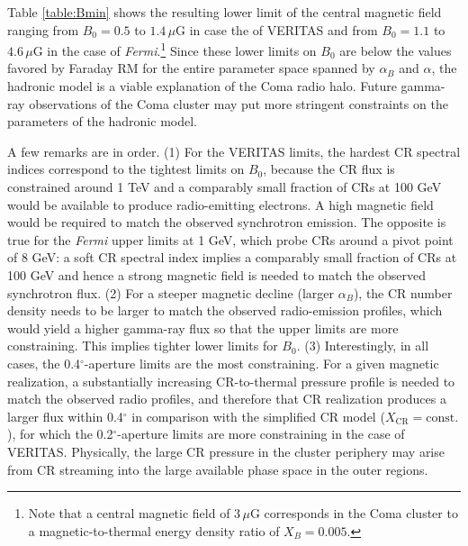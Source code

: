 \documentclass[12pt,manuscript]{aastex}
\def\Fermi{{\em Fermi}\xspace}
\newcommand{\rmn}{\mathrm}
\newcommand{\CR}{\mathrm{CR}}
\begin{document}
Table \ref{table:Bmin} shows the resulting lower limit of the central magnetic field ranging from
$B_{0} = 0.5$ to $1.4\,\mu$G in case the of VERITAS and from $B_{0} = 1.1$ to $4.6\,\mu$G in the
case of \Fermi.\footnote{Note that a central magnetic field of $3\,\mu$G corresponds in the Coma
  cluster to a magnetic-to-thermal energy density ratio of $X_B=0.005$.} Since these lower limits on
$B_{0}$ are below the values favored by Faraday RM for the entire parameter space spanned by
$\alpha_{B}$ and $\alpha$, the hadronic model is a viable explanation of the Coma radio halo. Future
gamma-ray observations of the Coma cluster may put more stringent constraints on the parameters of
the hadronic model.

A few remarks are in order. (1) For the VERITAS limits, the hardest
CR spectral indices correspond to the tightest limits on $B_{0}$, because the CR flux is constrained
around 1 TeV and a comparably small fraction of CRs at 100 GeV would be available to produce
radio-emitting electrons. A high magnetic field would be required to match the observed
synchrotron emission. The opposite is true for the \Fermi upper limits at 1 GeV, which
probe CRs around a pivot point of 8 GeV: a soft CR spectral index implies a comparably small
fraction of CRs at 100 GeV and hence a strong magnetic field is needed to match the observed
synchrotron flux. (2) For a steeper
magnetic decline (larger $\alpha_{B}$), the CR number density needs to be larger to match the
observed radio-emission profiles, which would yield a higher gamma-ray flux so that the upper limits
are more constraining. This implies tighter lower limits for $B_{0}$. (3) Interestingly, in all
cases, the 0.4$^{\circ}$-aperture limits are the most constraining. For a given magnetic
realization, a substantially increasing CR-to-thermal pressure profile is needed to match the
observed radio profiles, and therefore that CR realization produces a larger flux within 
0.4$^{\circ}$ in comparison with the simplified CR model ($X_{\CR} = \rmn{const.}$), for which the
0.2$^{\circ}$-aperture limits are more constraining in the case of VERITAS. Physically, the large
CR pressure in the cluster periphery may arise from CR streaming into the large available phase
space in the outer regions.
\end{document}
